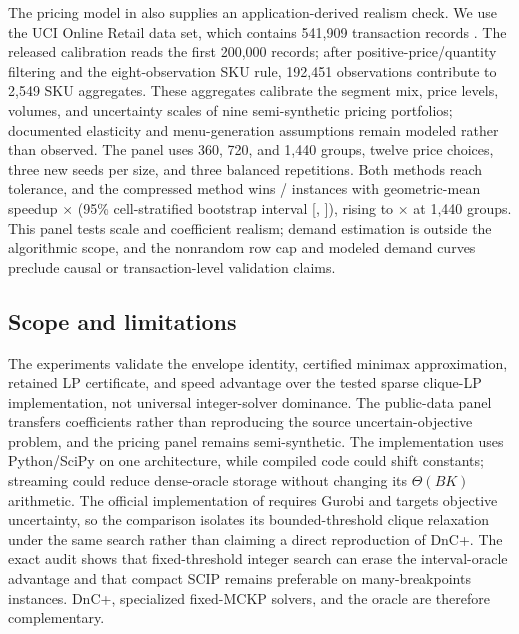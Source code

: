 \documentclass[11pt]{article}
\theoremstyle{plain}
\theoremstyle{definition}
\theoremstyle{remark}
\begin{document}
The pricing model in  also supplies an application-derived realism check.  We use the UCI Online Retail data set, which contains 541,909 transaction records \citep{Chen2015UCI}.  The released calibration reads the first 200,000 records; after positive-price/quantity filtering and the eight-observation SKU rule, 192,451 observations contribute to 2,549 SKU aggregates.  These aggregates calibrate the segment mix, price levels, volumes, and uncertainty scales of nine semi-synthetic pricing portfolios; documented elasticity and menu-generation assumptions remain modeled rather than observed.  The panel uses 360, 720, and 1,440 groups, twelve price choices, three new seeds per size, and three balanced repetitions.  Both methods reach tolerance, and the compressed method wins \PubApplicationWins{}/\PubApplicationCases{} instances with geometric-mean speedup \PubApplicationGeoSpeedup$\times$ (95\% cell-stratified bootstrap interval [\PubApplicationCILow, \PubApplicationCIHigh]), rising to \PubApplicationNHighSpeedup$\times$ at 1,440 groups.  This panel tests scale and coefficient realism; demand estimation is outside the algorithmic scope, and the nonrandom row cap and modeled demand curves preclude causal or transaction-level validation claims.

\subsection{Scope and limitations}

The experiments validate the envelope identity, certified minimax approximation, retained LP certificate, and speed advantage over the tested sparse clique-LP implementation, not universal integer-solver dominance.  The public-data panel transfers coefficients rather than reproducing the source uncertain-objective problem, and the pricing panel remains semi-synthetic.  The implementation uses Python/SciPy on one architecture, while compiled code could shift constants; streaming could reduce dense-oracle storage without changing its $\Theta(BK)$ arithmetic.  The official implementation of \citet{BusingGersingKoster2023} requires Gurobi and targets objective uncertainty, so the comparison isolates its bounded-threshold clique relaxation under the same search rather than claiming a direct reproduction of DnC+.  The exact audit shows that fixed-threshold integer search can erase the interval-oracle advantage and that compact SCIP remains preferable on many-breakpoints instances.  DnC+, specialized fixed-MCKP solvers, and the oracle are therefore complementary.
\end{document}
